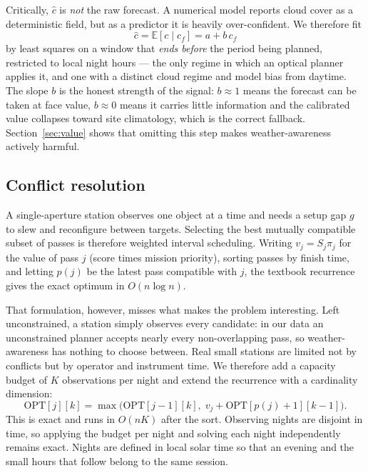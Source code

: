 \documentclass[conference]{IEEEtran}
\begin{document}
Critically, $\hat{c}$ is \emph{not} the raw forecast. A numerical model reports
cloud cover as a deterministic field, but as a predictor it is heavily
over-confident. We therefore fit
\begin{equation}
\hat{c} = \mathbb{E}[c \mid c_f] = a + b\,c_f
\label{eq:calib}
\end{equation}
by least squares on a window that \emph{ends before} the period being planned,
restricted to local night hours --- the only regime in which an optical planner
applies it, and one with a distinct cloud regime and model bias from daytime.
The slope $b$ is the honest strength of the signal: $b \approx 1$ means the
forecast can be taken at face value, $b \approx 0$ means it carries little
information and the calibrated value collapses toward site climatology, which is
the correct fallback. Section~\ref{sec:value} shows that omitting this step makes
weather-awareness actively harmful.

\subsection{Conflict resolution}
\label{sec:sched}
A single-aperture station observes one object at a time and needs a setup gap
$g$ to slew and reconfigure between targets. Selecting the best mutually
compatible subset of passes is therefore weighted interval scheduling. Writing
$v_j = S_j \pi_j$ for the value of pass $j$ (score times mission priority),
sorting passes by finish time, and letting $p(j)$ be the latest pass compatible
with $j$, the textbook recurrence~\cite{kleinberg2006algorithm} gives the exact
optimum in $O(n\log n)$.

That formulation, however, misses what makes the problem interesting. Left
unconstrained, a station simply observes every candidate: in our data an
unconstrained planner accepts nearly every non-overlapping pass, so
weather-awareness has nothing to choose between. Real small stations are limited
not by conflicts but by operator and instrument time. We therefore add a
capacity budget of $K$ observations per night and extend the recurrence with a
cardinality dimension:
\begin{equation}
\mathrm{OPT}[j][k] = \max\bigl(\mathrm{OPT}[j\!-\!1][k],\;
      v_j + \mathrm{OPT}[p(j)\!+\!1][k\!-\!1]\bigr).
\label{eq:dp}
\end{equation}
This is exact and runs in $O(nK)$ after the sort. Observing nights are disjoint
in time, so applying the budget per night and solving each night independently
remains exact. Nights are defined in local solar time so that an evening and the
small hours that follow belong to the same session.
\end{document}
